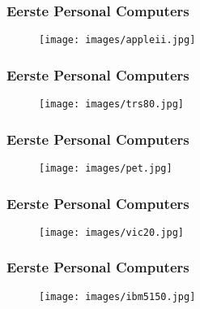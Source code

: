\documentclass[aspectratio=43]{uva-inf-presentation}
\begin{document}
\begin{frame}
\frametitle{Eerste Personal Computers}

\begin{figure}
\texttt{[image: images/appleii.jpg]}
\end{figure}

\end{frame}


\begin{frame}
\frametitle{Eerste Personal Computers}

\begin{figure}
\texttt{[image: images/trs80.jpg]}
\end{figure}

\end{frame}


\begin{frame}
\frametitle{Eerste Personal Computers}

\begin{figure}
\texttt{[image: images/pet.jpg]}
\end{figure}

\end{frame}


\begin{frame}
\frametitle{Eerste Personal Computers}

\begin{figure}
\texttt{[image: images/vic20.jpg]}
\end{figure}

\end{frame}


\begin{frame}
\frametitle{Eerste Personal Computers}

\begin{figure}
\texttt{[image: images/ibm5150.jpg]}
\end{figure}

\end{frame}

\end{document}
